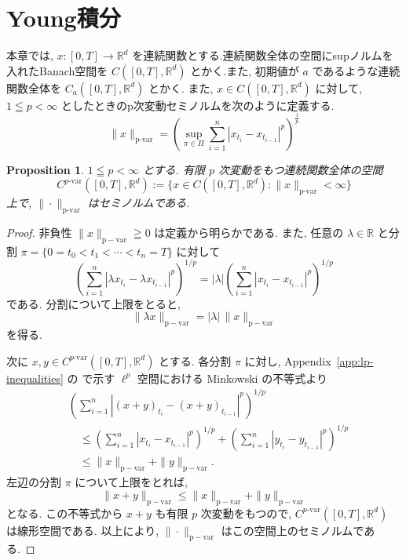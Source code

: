 \documentclass[11pt]{article}
\theoremstyle{breakstyle}
\newtheorem{proposition}[theorem]{Proposition}
\begin{document}
\section{Young積分}
本章では, $x: [0,T]\rightarrow \mathbb{R}^d$ を連続関数とする.連続関数全体の空間にsupノルムを入れたBanach空間を $C([0,T],\mathbb{R}^d)$ とかく.また, 
初期値が $a$ であるような連続関数全体を $C_a([0,T],\mathbb{R}^d)$ とかく.
また, $x\in C([0,T],\mathbb{R}^d)$ に対して, $1\leqq p<\infty$ としたときのp次変動セミノルムを次のように定義する.
\begin{equation*}
    \|x\|_{\text{p-var}}=(\sup_{\pi \in\Pi}\sum_{i=1}^{n}|x_{t_i}-x_{t_{i-1}}|^p)^\frac{1}{p}
\end{equation*}
\begin{proposition}
    \label{prop:pvar-seminorm}
    $1\leqq p<\infty$ とする. 有限 $p$ 次変動をもつ連続関数全体の空間
    \begin{equation*}
        C^{p\text{-var}}([0,T],\mathbb{R}^d)
        :=\bigl\{x\in C([0,T],\mathbb{R}^d):
        \|x\|_{\text{p-var}}<\infty\bigr\}
    \end{equation*}
    上で, $\|\cdot\|_{\text{p-var}}$ はセミノルムである.
\end{proposition}
\begin{proof}
    非負性 $\|x\|_{\mathrm{p-var}}\geqq0$ は定義から明らかである. また,
    任意の $\lambda\in\mathbb{R}$ と分割
    $\pi=\{0=t_0<t_1<\cdots<t_n=T\}$ に対して
    \begin{equation*}
        \left(\sum_{i=1}^n
        |\lambda x_{t_i}-\lambda x_{t_{i-1}}|^p\right)^{1/p}
        =|\lambda|
        \left(\sum_{i=1}^n|x_{t_i}-x_{t_{i-1}}|^p\right)^{1/p}
    \end{equation*}
    である. 分割について上限をとると,
    \begin{equation*}
        \|\lambda x\|_{\mathrm{p-var}}
        =|\lambda|\,\|x\|_{\mathrm{p-var}}
    \end{equation*}
    を得る.

    次に $x,y\in C^{p\text{-var}}([0,T],\mathbb{R}^d)$ とする. 各分割 $\pi$ に対し,
    Appendix~\ref{app:lp-inequalities} の  で示す
    $\ell^p$ 空間における Minkowski の不等式より
    \begin{align*}
        &\left(\sum_{i=1}^n
        |(x+y)_{t_i}-(x+y)_{t_{i-1}}|^p\right)^{1/p}\\
        &\quad\leq
        \left(\sum_{i=1}^n|x_{t_i}-x_{t_{i-1}}|^p\right)^{1/p}
        +
        \left(\sum_{i=1}^n|y_{t_i}-y_{t_{i-1}}|^p\right)^{1/p}\\
        &\quad\leq
        \|x\|_{\mathrm{p-var}}+\|y\|_{\mathrm{p-var}}.
    \end{align*}
    左辺の分割 $\pi$ について上限をとれば,
    \begin{equation*}
        \|x+y\|_{\mathrm{p-var}}
        \leq \|x\|_{\mathrm{p-var}}+\|y\|_{\mathrm{p-var}}
    \end{equation*}
    となる. この不等式から $x+y$ も有限 $p$ 次変動をもつので,
    $C^{p\text{-var}}([0,T],\mathbb{R}^d)$ は線形空間である. 以上により,
    $\|\cdot\|_{\mathrm{p-var}}$ はこの空間上のセミノルムである.
\end{proof}
\end{document}
